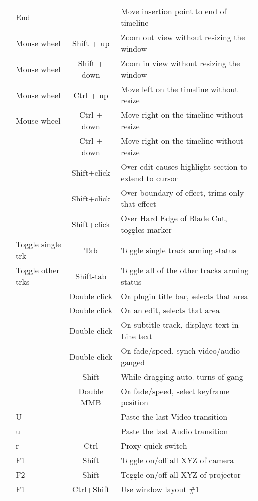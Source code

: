 \begin{center}
\begin{longtable}{ >{\bfseries}c l c p{6cm}}
        & End &  & Move insertion point to end of timeline \\        
        & Mouse wheel & Shift + up & Zoom out view without resizing the window \\        
        & Mouse wheel & Shift + down & Zoom in view without resizing the window \\        
        & Mouse wheel & Ctrl + up & Move left on the timeline without resize \\        
        & Mouse wheel & Ctrl + down & Move right on the timeline without resize \\        
        &  & Ctrl + down & Move right on the timeline without resize \\        
        &  & Shift+click & Over edit causes highlight section to extend to cursor \\        
        &  & Shift+click & Over boundary of effect, trims only that effect \\        
        &  & Shift+click & Over Hard Edge of Blade Cut, toggles marker \\        
        & Toggle single trk & Tab & Toggle single track arming status \\        
        & Toggle other trks & Shift-tab & Toggle all of the other tracks arming status \\        
        &  & Double click & On plugin title bar, selects that area \\        
        &  & Double click & On an edit, selects that area \\        
        &  & Double click & On subtitle track, displays text in Line text \\        
        &  & Double click & On fade/speed, synch video/audio ganged \\        
        &  & Shift & While dragging auto, turns of gang \\        
        &  & Double MMB & On fade/speed, select keyframe position \\        
        & U &  & Paste the last Video transition \\        
        & u &  & Paste the last Audio transition \\        
        & r & Ctrl & Proxy quick switch \\        
        & F1 & Shift & Toggle on/off all XYZ of camera \\        
        & F2 & Shift & Toggle on/off all XYZ of projector \\        
        & F1 & Ctrl+Shift & Use window layout \#1 \\        

\end{longtable}
\end{center}
